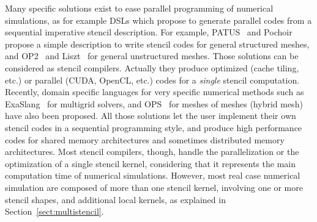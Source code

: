 
Many specific solutions exist to ease parallel programming of numerical simulations, %
as for example DSLs which propose to generate parallel codes from a sequential imperative stencil description. For example, PATUS~\cite{citeulike12258902} and Pochoir~\cite{spaaTangCKLL11} propose a simple description to write stencil codes for general structured meshes, and OP2~\cite{Giles2011} and Liszt~\cite{DeVito2011LDS} for general unstructured meshes. Those solutions can be considered as stencil compilers. Actually they produce optimized (cache tiling, etc.) or parallel (CUDA, OpenCL, etc.) codes for a \emph{single} stencil computation.
Recently, domain specific languages for very specific numerical methods such as ExaSlang~\cite{Schmitt:2014:EDL:2691166.2691171} for multigrid solvers, and OPS~\cite{Reguly:2014:ODS:2691166.2691173} for meshes of meshes (hybrid mesh) have also been proposed. 
All those solutions let the user implement their own stencil codes in a sequential programming style, and produce high performance codes for shared memory architectures and sometimes distributed memory architectures. 
Most stencil compilers, though, handle the parallelization or the optimization of a single stencil kernel, considering that it represents the main computation time of numerical simulations. However, most real case numerical simulation are composed of more than one stencil kernel, involving one or more stencil shapes, and additional local kernels, as explained in Section~\ref{sect:multistencil}.

